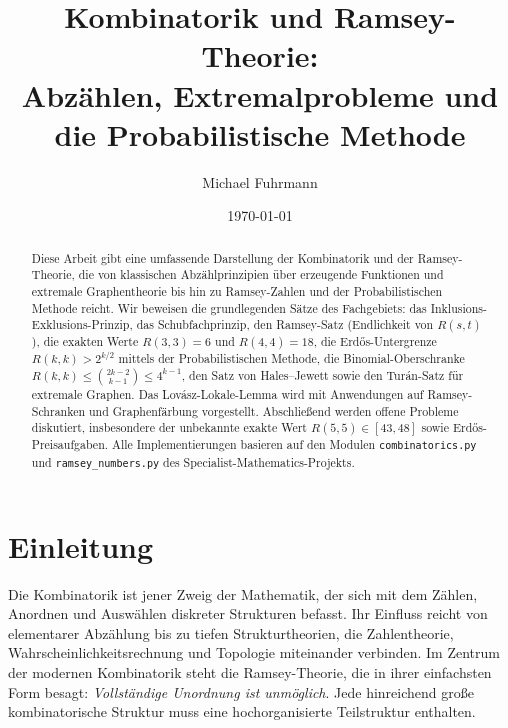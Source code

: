 \documentclass[12pt,a4paper]{amsart}
\theoremstyle{definition}
\theoremstyle{remark}
\begin{document}
\title{Kombinatorik und Ramsey-Theorie:\\
Abz{\"a}hlen, Extremalprobleme und die Probabilistische Methode}

\author{Michael Fuhrmann}
\address{Specialist Mathematics Project, Build 144}
\date{\today}

\begin{abstract}
Diese Arbeit gibt eine umfassende Darstellung der Kombinatorik und der
Ramsey-Theorie, die von klassischen Abz\"ahlprinzipien \"uber erzeugende
Funktionen und extremale Graphentheorie bis hin zu Ramsey-Zahlen und der
Probabilistischen Methode reicht.  Wir beweisen die grundlegenden S\"atze
des Fachgebiets: das Inklusions-Exklusions-Prinzip, das Schubfachprinzip,
den Ramsey-Satz (Endlichkeit von $R(s,t)$), die exakten Werte $R(3,3)=6$ und
$R(4,4)=18$, die Erd\H{o}s-Untergrenze $R(k,k) > 2^{k/2}$ mittels der
Probabilistischen Methode, die Binomial-Oberschranke
$R(k,k) \le \binom{2k-2}{k-1} \le 4^{k-1}$, den Satz von Hales--Jewett sowie
den Tur\'an-Satz f\"ur extremale Graphen.  Das Lov\'asz-Lokale-Lemma wird mit
Anwendungen auf Ramsey-Schranken und Graphenf\"arbung vorgestellt.  Abschlie\ss{}end
werden offene Probleme diskutiert, insbesondere der unbekannte exakte Wert
$R(5,5) \in [43,48]$ sowie Erd\H{o}s-Preisaufgaben.  Alle Implementierungen
basieren auf den Modulen \texttt{combinatorics.py} und \texttt{ramsey\_numbers.py}
des Specialist-Mathematics-Projekts.
\end{abstract}

\maketitle

\tableofcontents

\section{Einleitung}

Die Kombinatorik ist jener Zweig der Mathematik, der sich mit dem Z\"ahlen,
Anordnen und Ausw\"ahlen diskreter Strukturen befasst.  Ihr Einfluss reicht von
elementarer Abz\"ahlung bis zu tiefen Strukturtheorien, die Zahlentheorie,
Wahrscheinlichkeitsrechnung und Topologie miteinander verbinden.  Im Zentrum
der modernen Kombinatorik steht die Ramsey-Theorie, die in ihrer einfachsten
Form besagt: \emph{Vollst\"andige Unordnung ist unm\"oglich}.  Jede hinreichend
gro\ss{}e kombinatorische Struktur muss eine hochorganisierte Teilstruktur
enthalten.
\end{document}
